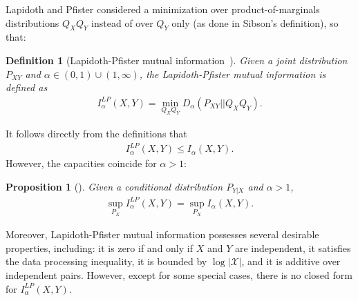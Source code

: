 \documentclass{article}
\numberwithin{theorem}{section}
\numberwithin{example}{section}
\numberwithin{remark}{section}
\newtheorem{definition}{Definition}
\numberwithin{definition}{section}
\newtheorem{proposition}[theorem]{Proposition}
\newcommand{\X}{\mathcal{X}}
\newcommand{\range}{(0,1) \cup (1,\infty)}
\begin{document}
Lapidoth and Pfister considered a minimization over product-of-marginals distributions $Q_XQ_Y$ instead of over $Q_Y$ only (as done in Sibson's definition), so that:

\begin{definition}[Lapidoth-Pfister mutual information~\cite{LapidothP:18}] Given a joint distribution $P_{XY}$ and $\alpha \in \range$, the Lapidoth-Pfister mutual information is defined as
\begin{align}
    I_\alpha^{LP} (X,Y) = \min_{Q_X Q_Y} D_\alpha (P_{XY} || Q_X Q_Y).
\end{align}
\end{definition}
It follows directly from the definitions that 
\begin{align} \label{eq:lapidoth-pfister-sibson}
I_\alpha^{LP} (X,Y) \leq I_\alpha (X,Y).
\end{align}
However, the capacities coincide for $\alpha > 1$:
\begin{proposition}[{\cite[Theorem V.1]{aishwarya:19}}]
    Given a conditional distribution $P_{Y|X}$ and $\alpha >1$,
    \begin{align}
        \label{eq:prop-lp-capacity}
        \sup_{P_X} I_\alpha^{LP}(X,Y) = \sup_{P_X} I_\alpha (X,Y).
    \end{align}
\end{proposition}
Moreover, Lapidoth-Pfister mutual information possesses several desirable properties, including: it is zero if and only if $X$ and $Y$ are independent, it satisfies the data processing inequality, it is bounded by $\log | \X |$, and it is additive over independent pairs. However, except for some special cases, there is no closed form for $I_\alpha^{LP}(X,Y).$
\end{document}
